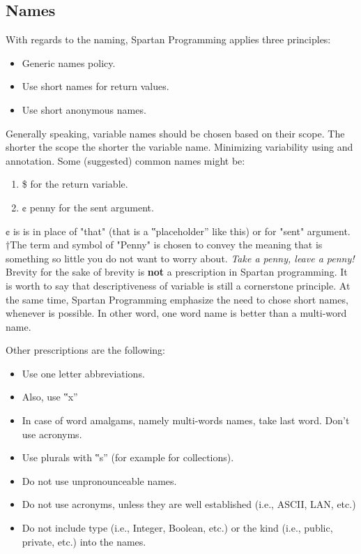 \subsection{Names}
With regards to the naming, Spartan Programming applies three principles:
\begin{itemize}
 \item Generic names policy.
 \item Use short names for return values.
 \item Use short anonymous names.
\end{itemize}
Generally speaking, variable names should be chosen based on their scope.
The shorter the scope the shorter the variable name.
Minimizing variability using  and  annotation.
Some (suggested) common names might be:
\begin{enumerate}
  \item \$ for the return variable.
  \item ¢ penny for the sent argument.
\end{enumerate}
¢ is is in place of "that" (that is a ‟placeholder” like this) or for "sent" argument.
†{The term and symbol of "Penny" is chosen to convey the meaning that is something so little you do not want to worry about.
\emph{Take a penny, leave a penny!}}
Brevity for the sake of brevity is \textbf{not} a prescription in Spartan programming.
It is worth to say that descriptiveness of variable is still a cornerstone principle.
At the same time, Spartan Programming emphasize the need to chose short names, whenever is possible.
In other word, one word name is better than a multi-word name.

Other prescriptions are the following:
\begin{itemize}
 \item Use one letter abbreviations.
 \item Also, use ‟x”
 \item In case of word amalgams, namely multi-words names, take last word.
   Don't use acronyms.

 \item Use plurals with ‟s” (for example for collections).

 \item Do not use unpronounceable names.
 \item Do not use acronyms, unless they are well established (i.e., ASCII, LAN,
   etc.)

 \item Do not include type (i.e., Integer, Boolean, etc.) or the kind (i.e.,
   public, private, etc.) into the names.

\end{itemize}

